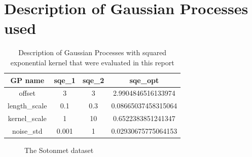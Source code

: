 \documentclass{article}
\begin{document}
\section{Description of Gaussian Processes used}\label{appendix:gp_table}

\begin{table}[ht]
\centering
\begin{tabular}{|c|c|c|c|}
\hline
GP name & sqe\_1 & sqe\_2 & sqe\_opt \\
\hline
offset                      & 3     & 3   & 2.9904846516133974 \\
length\_scale & 0.1   & 0.3 & 0.08665037458315064 \\
kernel\_scale & 1     & 10  & 0.6522383851241347 \\
noise\_std    & 0.001 & 1   & 0.02930675775064153 \\
\hline
\end{tabular}
\caption{Description of Gaussian Processes with squared exponential kernel that were evaluated in this report}
\label{table:sqe_table}
\end{table}

\begin{figure}[ht]
    \centering
    \caption{The Sotonmet dataset}
    \label{fig:sotonmet}
\end{figure}
\end{document}
